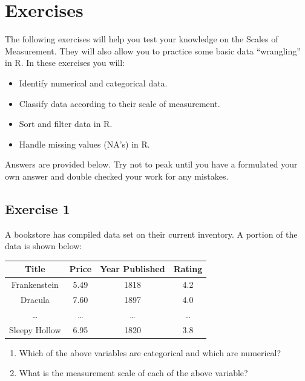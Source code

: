 \documentclass[
  letterpaper,
  DIV=11,
  numbers=noendperiod]{scrreprt}
\providecommand{\tightlist}{%
  \setlength{\itemsep}{0pt}\setlength{\parskip}{0pt}}\usepackage{longtable,booktabs,array}
\begin{document}
\hypertarget{exercises}{%
\section{Exercises}\label{exercises}}

The following exercises will help you test your knowledge on the Scales
of Measurement. They will also allow you to practice some basic data
``wrangling'' in R. In these exercises you will:

\begin{itemize}
\item
  Identify numerical and categorical data.
\item
  Classify data according to their scale of measurement.
\item
  Sort and filter data in R.
\item
  Handle missing values (NA's) in R.
\end{itemize}

Answers are provided below. Try not to peak until you have a formulated
your own answer and double checked your work for any mistakes.

\hypertarget{exercise-1}{%
\subsection*{Exercise 1}\label{exercise-1}}

A bookstore has compiled data set on their current inventory. A portion
of the data is shown below:

\begin{longtable}[]{@{}cccc@{}}
\toprule()
Title & Price & Year Published & Rating \\
\midrule()
\endhead
Frankenstein & 5.49 & 1818 & 4.2 \\
Dracula & 7.60 & 1897 & 4.0 \\
\ldots{} & \ldots{} & \ldots{} & \ldots{} \\
Sleepy Hollow & 6.95 & 1820 & 3.8 \\
\bottomrule()
\end{longtable}

\begin{enumerate}
\def\labelenumi{\arabic{enumi}.}
\tightlist
\item
  Which of the above variables are categorical and which are numerical?
\item
  What is the measurement scale of each of the above variable?
\end{enumerate}
\end{document}
